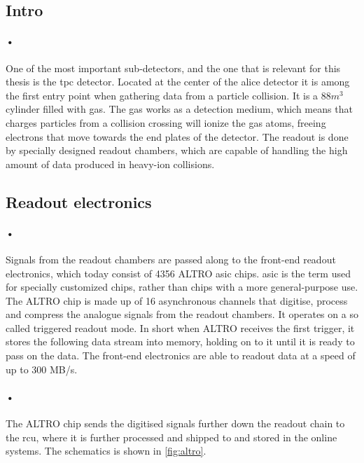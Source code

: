 \documentclass[a4paper]{report}
\begin{document}
\subsection{Intro}
\paragraph{•}
One of the most important sub-detectors, and the one that is relevant for this thesis is the \gls{tpc} detector. 
Located at the center of the \gls{alice} detector it is among the first entry point when gathering data from a particle collision.
It is a 88\(m^3\) cylinder filled with gas.
The gas works as a detection medium, which means that charges particles from a collision crossing will ionize the gas atoms, freeing electrons that move towards the end plates of the detector.
The readout is done by specially designed readout chambers, which are capable of handling the high amount of data produced in heavy-ion collisions.

\subsection{Readout electronics} %
\paragraph{•}
Signals from the readout chambers are passed along to the front-end readout electronics, which today consist of 4356 ALTRO \gls{asic} chips.\cite{altro}
\gls{asic} is the term used for specially customized chips, rather than chips with a more general-purpose use.\cite{asic}
The ALTRO chip is made up of 16 asynchronous channels that digitise, process and compress the analogue signals from the readout chambers.
It operates on a so called triggered readout mode.
In short when ALTRO receives the first trigger, it stores the following data stream into memory, holding on to it until it is ready to pass on the data. 
The front-end electronics are able to readout data at a speed of up to 300 MB/s.
\paragraph{•} 
The ALTRO chip sends the digitised signals further down the readout chain to the \gls{rcu}, where it is further processed and shipped to  and stored in the online systems.
The schematics is shown in \ref{fig:altro}.
\end{document}
